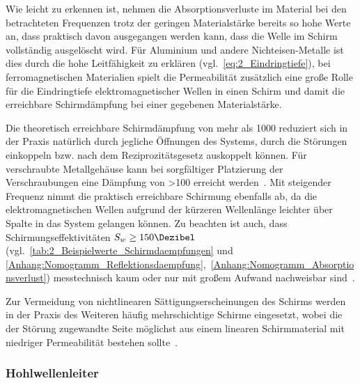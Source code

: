 Wie leicht zu erkennen ist, nehmen die Absorptionsverluste im Material bei den betrachteten Frequenzen trotz der geringen Materialstärke bereits so hohe Werte an, dass praktisch davon ausgegangen werden kann, dass die Welle im Schirm vollständig ausgelöscht wird. Für Aluminium und andere Nichteisen-Metalle ist dies durch die hohe Leitfähigkeit zu erklären (vgl.~\Gleichung\eqref{eq:2_Eindringtiefe}), bei ferromagnetischen Materialien spielt die Permeabilität zusätzlich eine große Rolle für die Eindringtiefe elektromagnetischer Wellen in einen Schirm und damit die erreichbare Schirmdämpfung bei einer gegebenen Materialstärke. 
\par
\vspace{\linespace}
Die theoretisch erreichbare Schirmdämpfung von mehr als \SI{1000}{\Dezibel} reduziert sich in der Praxis natürlich durch jegliche Öffnungen des Systems, durch die Störungen einkoppeln bzw. nach dem Reziprozitätsgesetz auskoppelt können. Für verschraubte Metallgehäuse kann bei sorgfältiger Platzierung der Verschraubungen eine Dämpfung von >\SI{100}{\Dezibel} erreicht werden~\cite{Design_of_shielded_enclosures}. Mit steigender Frequenz nimmt die praktisch erreichbare Schirmung ebenfalls ab, da die elektromagnetischen Wellen aufgrund der kürzeren Wellenlänge leichter über Spalte in das System gelangen können. Zu beachten ist auch, dass Schirmungseffektivitäten $S_w \geq 150 \si{\Dezibel}$ (vgl.~\Tabelle\ref{tab:2_Beispielwerte_Schirmdaempfungen} und \Anhang\ref{Anhang:Nomogramm_Reflektionsdaempfung},~\ref{Anhang:Nomogramm_Absorptionsverlust}) messtechnisch kaum oder nur mit großem Aufwand nachweisbar sind~\cite{EM_Schirmung}.
\par
\vspace{\linespace}
Zur Vermeidung von nichtlinearen Sättigungserscheinungen des Schirms werden in der Praxis des Weiteren häufig mehrschichtige Schirme eingesetzt, wobei die der Störung zugewandte Seite möglichst aus einem linearen Schirmmaterial mit niedriger Permeabilität bestehen sollte~\cite{EMV}. 



\subsubsection{Hohlwellenleiter}\label{cha:2_subsub_Hohlwellenleiter}

